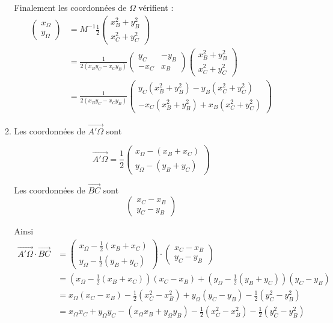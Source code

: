 \documentclass[a4paper, 11pt,reqno]{article}
\newcommand\vv[1]{\overrightarrow{#1}}
\begin{document}
\begin{correction}
\begin{enumerate}
\begin{enumerate}
Finalement les coordonnées de $\Omega$ vérifient : 
\begin{align*}
\begin{pmatrix}
x_\Omega\\
y_\Omega
\end{pmatrix}&= M^{-1} \frac{1}{2}\begin{pmatrix}
x_B^2+y_B^2\\
x_C^2+y_C^2
\end{pmatrix} \\
&=\frac{1}{2(x_By_C -x_Cy_B )}\begin{pmatrix}
y_C & -y_B\\
-x_C & x_B
\end{pmatrix}\begin{pmatrix}
x_B^2+y_B^2\\
x_C^2+y_C^2
\end{pmatrix} \\
&= 
\frac{1}{2\left(x_B y_C-x_C y_B\right)}\left(\begin{array}{c}
y_C\left(x_B^2+y_B^2\right)-y_B\left(x_C^2+y_C^2\right) \\
-x_C\left(x_B^2+y_B^2\right)+x_B\left(x_C^2+y_C^2\right)
\end{array}\right)
\end{align*}


\item Les coordonnées de $\vv{A'\Omega}$ sont 

$$\vv{A'\Omega} =\frac{1}{2}\begin{pmatrix}
x_\Omega-(x_B+x_C)\\
y_\Omega -(y_B+y_C)
\end{pmatrix}$$

Les coordonnées de $\vv{BC}$ sont 
$$\begin{pmatrix}
x_C-x_B\\
y_C-y_B
\end{pmatrix}$$

Ainsi 
\begin{align*}
\vv{A'\Omega } \cdot \vv{BC} 
&=\begin{pmatrix}
x_\Omega-\frac{1}{2}(x_B+x_C)\\
y_\Omega -\frac{1}{2} (y_B+y_C)
\end{pmatrix} \cdot \begin{pmatrix}
x_C-x_B\\
y_C-y_B
\end{pmatrix}\\
&= (x_\Omega-\frac{1}{2}(x_B+x_C) )(x_C-x_B)+(y_\Omega -\frac{1}{2}(y_B+y_C) )(y_C-y_B) \\
&=x_\Omega(x_C-x_B) -\frac{1}{2} (x_C^2 -x_B^2) + y_\Omega (y_C-y_B) - \frac{1}{2}(y_C^2 -y_B^2)\\
&=x_\Omega x_C+y_\Omega y_C - ( x_\Omega x_B+y_\Omega y_B)  -\frac{1}{2} (x_C^2 -x_B^2) - \frac{1}{2}(y_C^2 -y_B^2)
\end{align*}


\end{enumerate}
\end{enumerate}
\end{correction}
\end{document}
